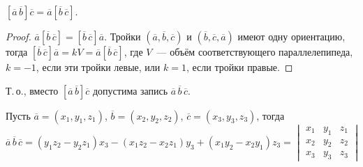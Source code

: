 \begin{statement}
$[\overline a\,\overline b] \overline c = \overline a [\overline b\,\overline c]$.
\end{statement}
\begin{proof}
$\overline a [\overline b\,\overline c] = [\overline b\,\overline c] \overline a$.
Тройки $(\overline a, \overline b, \overline c)$ и $(\overline b, \overline c, \overline a)$ имеют одну ориентацию, тогда $[\overline b\,\overline c] \overline a = kV = \overline a [\overline b\,\overline c]$, где $V$~--- объём соответствующего параллелепипеда, $k = -1$, если эти тройки левые, или $k = 1$, если тройки правые.
\end{proof}

Т.\,о., вместо $[\overline a\,\overline b] \overline c$ допустима запись $\overline a\,\overline b\,\overline c$.

Пусть $\overline a = (x_1, y_1, z_1)$, $\overline b = (x_2, y_2, z_2)$, $\overline c = (x_3, y_3, z_3)$, тогда
\begin{equation*}
\overline a\,\overline b\,\overline c =
(y_1 z_2 - y_2 z_1) x_3 - (x_1 z_2 - x_2 z_1) y_3 + (x_1 y_2 - x_2 y_1) z_3 =
\begin{vmatrix}
x_1 & y_1 & z_1 \\
x_2 & y_2 & z_2 \\
x_3 & y_3 & z_3
\end{vmatrix}
\end{equation*}